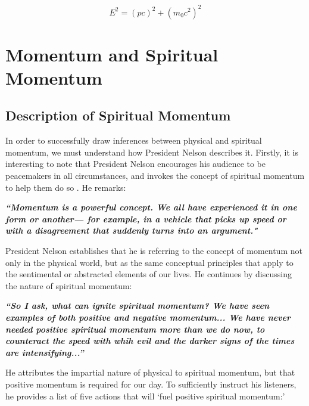 \documentclass{article}
\begin{document}
            \begin{equation}\label{eq:8}
                E^2 = (pc)^2 + (m_0c^2)^2
            \end{equation}

\newpage
        
    \section{Momentum and Spiritual Momentum}
            
        \subsection{Description of Spiritual Momentum}

            In order to successfully draw inferences between physical and spiritual momentum, we must understand how President Nelson describes it.
            Firstly, it is interesting to note that President Nelson encourages his audience to be peacemakers in all circumstances, and invokes the concept of spiritual momentum to help them do so \cite{Nelson}. 
            He remarks: 

            \begin{center}
                \textbf{\textit{``Momentum is a powerful concept. 
                We all have experienced it in one form or another— for example, in a vehicle that picks up speed or with a disagreement that suddenly turns into an argument."
                }}
            \end{center}

            President Nelson establishes that he is referring to the concept of momentum not only in the physical world, but as the same conceptual principles that apply to the sentimental or abstracted elements of our lives.
            He continues by discussing the nature of spiritual momentum:

            \begin{center}
                \textbf{\textit{``So I ask, what can ignite spiritual momentum? We have seen examples of both positive and negative momentum... 
                We have never needed positive spiritual momentum more than we do now, to counteract the speed with whih evil and the darker signs of the times are intensifying...''
                }}
            \end{center}

            He attributes the impartial nature of physical to spiritual momentum, but that positive momentum is required for our day. 
            To sufficiently instruct his listeners, he provides a list of five actions that will `fuel positive spiritual momentum:'
\end{document}
